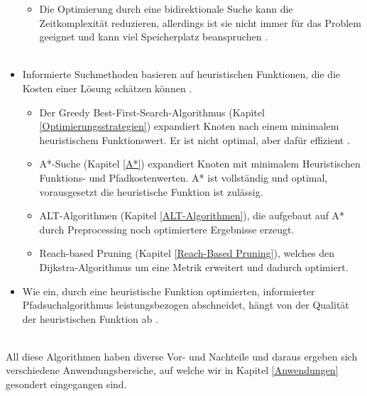 \begin{itemize}
\begin{itemize}
        \item Die Optimierung durch eine bidirektionale Suche kann die Zeitkomplexität reduzieren, allerdings ist sie nicht immer für das Problem geeignet und kann viel Speicherplatz beanspruchen \cite[108,109]{Russell:10}.\\\\
    \end{itemize}
    \newpage
    \item Informierte Suchmethoden basieren auf heuristischen Funktionen, die die Kosten einer Lösung schätzen können \cite[108,109]{Russell:10}. 
    \begin{itemize}
        \item Der Greedy Best-First-Search-Algorithmus (Kapitel \ref{Optimierungsstrategien}) expandiert Knoten nach einem minimalem heuristischem Funktionswert. Er ist nicht optimal, aber dafür effizient \cite[108,109]{Russell:10}.
        \item A*-Suche (Kapitel \ref{A*}) expandiert Knoten mit minimalem Heuristischen Funktions- und Pfadkostenwerten. A* ist vollständig und optimal, vorausgesetzt die heuristische Funktion ist zulässig.
        \item ALT-Algorithmen (Kapitel \ref{ALT-Algorithmen}), die aufgebaut auf A* durch Preprocessing noch optimiertere Ergebnisse erzeugt.
        \item Reach-based Pruning (Kapitel \ref{Reach-Based Pruning}), welches den Dijkstra-Algorithmus um eine Metrik erweitert und dadurch optimiert.
    \end{itemize}
    \item Wie ein, durch eine heuristische Funktion optimierten, informierter Pfadsuchalgorithmus leistungsbezogen abschneidet, hängt von der Qualität der heuristischen Funktion ab \cite[108,109]{Russell:10}.
\end{itemize}
\noindent \\
All diese Algorithmen haben diverse Vor- und Nachteile und daraus ergeben sich verschiedene 
Anwendungsbereiche, auf welche wir in Kapitel \ref{Anwendungen} gesondert eingegangen sind.
